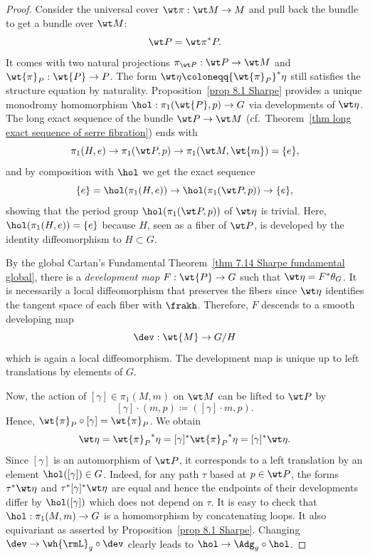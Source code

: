 \begin{proof}
    Consider the universal cover $\wt\pi:\wt M\to M$ and pull back the bundle to get a bundle over $\wt M$:
    \[\wt P={\wt\pi}^\ast P.\]
    It comes with two natural projections $\pi_{\wt P}:\wt P\to \wt M$ and $\wt{\pi}_P:\wt{P}\to P$. The form $\wt\eta\coloneqq {\wt{\pi}_P}^\ast\eta$ still satisfies the structure equation by naturality. Proposition~\ref{prop 8.1 Sharpe} provides a unique monodromy homomorphism $\hol:\pi_1(\wt{P},p)\to G$ via developments of $\wt\eta$. The long exact sequence of the bundle $\wt P\to \wt M$ (cf.\ Theorem~\ref{thm long exact sequence of serre fibration}) ends with
    \[\pi_1(H,e)\to \pi_1(\wt P,p)\to \pi_1(\wt M,\wt{m})=\{e\},\]
    and by composition with $\hol$ we get the exact sequence 
    \[\{e\}=\hol(\pi_1(H,e))\to \hol(\pi_1(\wt P,p))\to \{e\},\]
    showing that the period group $\hol(\pi_1(\wt P,p))$ of $\wt\eta$ is trivial. Here, $\hol(\pi_1(H,e))=\{e\}$ because $H$, seen as a fiber of $\wt P$, is developed by the identity diffeomorphism to $H\subset G$.

    By the global Cartan's Fundamental Theorem~\ref{thm 7.14 Sharpe fundamental global}, there is a \emph{development map} $F:\wt{P}\to G$ such that $\wt\eta=F^\ast\theta_G$. It is necessarily a local diffeomorphism that preserves the fibers since $\wt\eta$ identifies the tangent space of each fiber with $\frakh$. Therefore, $F$ descends to a smooth developing map 
    \[\dev:\wt{M}\to G\slash H\]
    which is again a local diffeomorphism. The development map is unique up to left translations by elements of $G$.

    Now, the action of $[\gamma]\in \pi_1(M,m)$ on $\wt M$ can be lifted to $\wt P$ by
    \[[\gamma]\cdot (m,p)\coloneqq ([\gamma]\cdot m,p).\]
    Hence, $\wt{\pi}_P\circ [\gamma]=\wt{\pi}_P$. We obtain
    \[\wt\eta={\wt{\pi}_P}^\ast \eta=[\gamma]^\ast {\wt{\pi}_P}^\ast \eta=[\gamma]^\ast\wt\eta.\]
    Since $[\gamma]$ is an automorphism of $\wt P$, it corresponds to a left translation by an element $\hol([\gamma])\in G$. Indeed, for any path $\tau$ based at $p\in\wt P$, the forms $\tau^\ast\wt\eta$ and $\tau^\ast[\gamma]^\ast\wt\eta$ are equal and hence the endpoints of their developments differ by $\hol([\gamma])$ which does not depend on $\tau$. It is easy to check that $\hol:\pi_1(M,m)\to G$ is a homomorphism by concatenating loops. It also equivariant as asserted by Proposition~\ref{prop 8.1 Sharpe}. Changing $\dev\to \wh{\rmL}_g\circ \dev$ clearly leads to $\hol\to \Adg_g\circ\hol$.


\end{proof}
